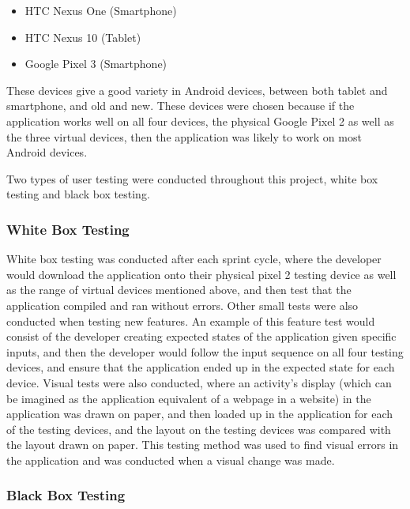 \documentclass{article}
\begin{document}
\begin{itemize}
	\item HTC Nexus One (Smartphone)
	\item HTC Nexus 10 (Tablet)
	\item Google Pixel 3 (Smartphone)
\end{itemize}

These devices give a good variety in Android devices, between both tablet and smartphone, and old and new. These devices were chosen because if the application works well on all four devices, the physical Google Pixel 2 as well as the three virtual devices, then the application was likely to work on most Android devices. \par

Two types of user testing were conducted throughout this project, white box testing and black box testing. \par 

\subsubsection{White Box Testing}

White box testing was conducted after each sprint cycle, where the developer would download the application onto their physical pixel 2 testing device as well as the range of virtual devices mentioned above, and then test that the application compiled and ran without errors. Other small tests were also conducted when testing new features. An example of this feature test would consist of the developer creating expected states of the application given specific inputs, and then the developer would follow the input sequence on all four testing devices, and ensure that the application ended up in the expected state for each device. Visual tests were also conducted, where an activity's display (which can be imagined as the application equivalent of a webpage in a website) in the application was drawn on paper, and then loaded up in the application for each of the testing devices, and the layout on the testing devices was compared with the layout drawn on paper. This testing method was used to find visual errors in the application and was conducted when a visual change was made. \par

\subsubsection{Black Box Testing}
\end{document}
